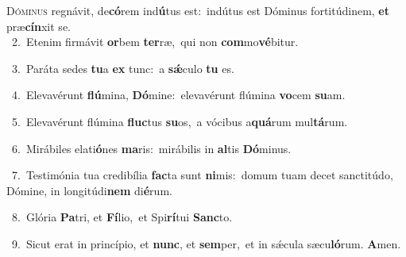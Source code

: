 \lettrine{\initial\textcolor{\initialcolor}{D}}{óminus} regnávit, de\-\textbf{có}\-rem ind\-\textbf{ú}\-tus est:~\star indútus est Dóminus fortitúdinem, \textbf{et} præ\-\textbf{cín}\-xit se.\\
{\numbfont\textcolor{\numbcolor}{~2.}}~Etenim firmávit \textbf{or}\-bem \textbf{ter}\-ræ,~\star qui non \textbf{com}\-mo\-\textbf{vé}\-bitur.\par
{\numbfont\textcolor{\numbcolor}{~3.}}~Paráta sedes \textbf{tu}\-a \textbf{ex} tunc:~\star a \textbf{sǽ}\-culo \textbf{tu} es.\par
{\numbfont\textcolor{\numbcolor}{~4.}}~Elevavérunt \textbf{flú}\-mina, \textbf{Dó}\-mine:~\star elevavérunt flúmina \textbf{vo}\-cem \textbf{su}\-am.\par
{\numbfont\textcolor{\numbcolor}{~5.}}~Elevavérunt flúmina \textbf{fluc}\-tus \textbf{su}\-os,~\star a vócibus a\-\textbf{quá}\-rum mul\-\textbf{tá}\-rum.\par
{\numbfont\textcolor{\numbcolor}{~6.}}~Mirábiles elati\-\textbf{ó}\-nes \textbf{ma}\-ris:~\star mirábilis in \textbf{al}\-tis \textbf{Dó}\-minus.\par
{\numbfont\textcolor{\numbcolor}{~7.}}~Testimónia tua credibília \textbf{fac}\-ta sunt \textbf{ni}\-mis:~\star domum tuam decet sanctitúdo, Dómine, in longitúdi\textbf{nem} di\-\textbf{é}\-rum.\par
{\numbfont\textcolor{\numbcolor}{~8.}}~Glória \textbf{Pa}\-tri, et \textbf{Fí}\-lio,~\star et Spi\-\textbf{rí}\-tui \textbf{Sanc}\-to.\par
{\numbfont\textcolor{\numbcolor}{~9.}}~Sicut erat in princípio, et \textbf{nunc}\-, et \textbf{sem}\-per,~\star et in sǽcula sæcu\-\textbf{ló}\-rum. \textbf{A}\-men.\par
